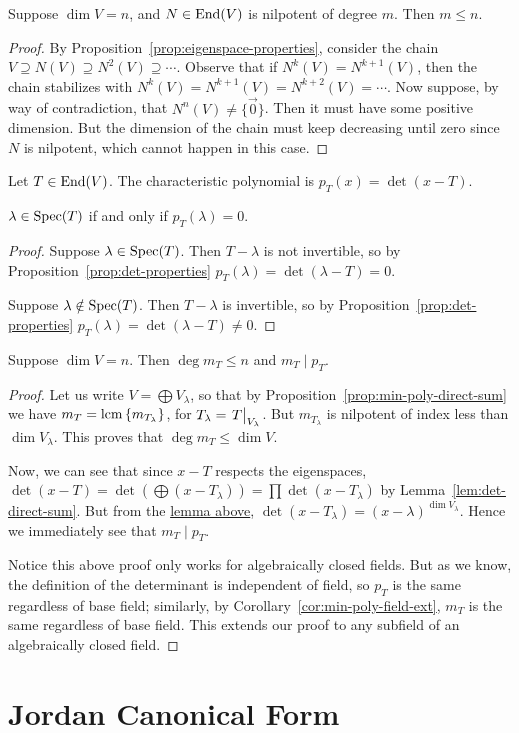\begin{lemma}
    Suppose \(\dim V = n\), and \(N \in \operatorname{End}(V)\) is nilpotent of degree \(m\).
    Then \(m \leq n\).
\end{lemma}
\begin{proof}
    By Proposition~\ref{prop:eigenspace-properties},
    consider the chain \(V \supseteq N(V) \supseteq N^2(V) \supseteq \cdots\).
    Observe that if \(N^k(V) = N^{k+1}(V)\),
    then the chain stabilizes with \(N^k(V) = N^{k+1}(V) = N^{k+2}(V) = \cdots\).
    Now suppose, by way of contradiction, that \(N^n(V) \neq \{\vec{0}\}\).
    Then it must have some positive dimension.
    But the dimension of the chain must keep decreasing until zero since \(N\) is nilpotent,
    which cannot happen in this case.
\end{proof}
\begin{definition}
    Let \(T \in \operatorname{End}(V)\).
    The characteristic polynomial is \(p_T(x) = \det(x-T)\).
\end{definition}
\begin{lemma}\label{lem:char-poly-roots}
    \(\lambda \in \operatorname{Spec}(T)\) if and only if \(p_T(\lambda) = 0\).
\end{lemma}
\begin{proof}
    Suppose \(\lambda \in \operatorname{Spec}(T)\).
    Then \(T-\lambda\) is not invertible,
    so by Proposition~\ref{prop:det-properties} \(p_T(\lambda) = \det(\lambda-T) = 0\).

    Suppose \(\lambda \notin \operatorname{Spec}(T)\).
    Then \(T-\lambda\) is invertible,
    so by Proposition~\ref{prop:det-properties} \(p_T(\lambda) = \det(\lambda-T) \neq 0\).
\end{proof}
\begin{theorem}\label{thm:cayley-hamilton}
    Suppose \(\dim V = n\).
    Then \(\deg m_T \leq n\) and \(m_T \mid p_T\).
\end{theorem}
\begin{proof}
    Let us write \(V = \bigoplus V_\lambda\),
    so that by Proposition~\ref{prop:min-poly-direct-sum} we have
    \(m_T = \operatorname{lcm}{\{m_{T_\lambda}\}}\), for \(T_\lambda = \eval{T}_{V_\lambda}\).
    But \(m_{T_\lambda}\) is nilpotent of index less than \(\dim V_\lambda\).
    This proves that \(\deg m_T \leq \dim V\).

    Now, we can see that since \(x-T\) respects the eigenspaces,
    \(\det(x-T) = \det(\bigoplus (x-T_\lambda)) = \prod \det(x-T_\lambda)\)
    by Lemma~\ref{lem:det-direct-sum}.
    But from the \hyperref[lem:char-poly-roots]{lemma above},
    \(\det(x-T_\lambda) = {(x-\lambda)}^{\dim V_\lambda}\).
    Hence we immediately see that \(m_T \mid p_T\).

    Notice this above proof only works for algebraically closed fields.
    But as we know, the definition of the determinant is independent of field,
    so \(p_T\) is the same regardless of base field;
    similarly, by Corollary~\ref{cor:min-poly-field-ext},
    \(m_T\) is the same regardless of base field.
    This extends our proof to any subfield of an algebraically closed field.
\end{proof}


\section{Jordan Canonical Form}
